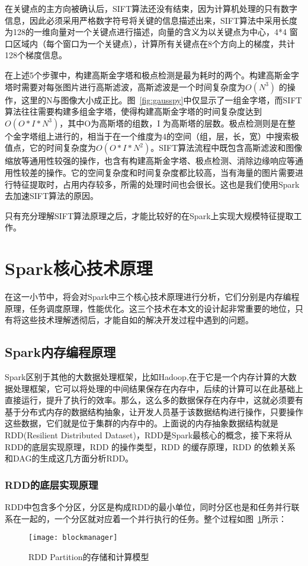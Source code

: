 在关键点的主方向被确认后，SIFT算法还没有结束，因为计算机处理的只有数字信息，因此必须采用严格数字符号将关键的信息描述出来，SIFT算法中采用长度为128的一维向量对一个关键点进行描述，向量的含义为以关键点为中心，4*4 窗口区域内（每个窗口为一个关键点），计算所有关键点在8个方向上的梯度，共计128个梯度信息。

在上述5个步骤中，构建高斯金字塔和极点检测是最为耗时的两个。构建高斯金字塔时需要对每张图片进行高斯滤波，高斯滤波是一个时间复杂度为$O(N^3)$ 的操作，这里的N与图像大小成正比。图~\ref{fig:gausspy}中仅显示了一组金字塔，而SIFT算法往往需要构建多组金字塔，使得构建高斯金字塔的时间复杂度达到$O(O*I*N^3)$，其中O为高斯塔的组数，I 为高斯塔的层数。极点检测则是在整个金字塔组上进行的，相当于在一个维度为4的空间（组，层，长，宽）中搜索极值点，它的时间复杂度为$O(O*I*N^2)$。SIFT算法流程中既包含高斯滤波和图像缩放等通用性较强的操作，也含有构建高斯金字塔、极点检测、消除边缘响应等通用性较差的操作。它的空间复杂度和时间复杂度都比较高，当有海量的图片需要进行特征提取时，占用内存较多，所需的处理时间也会很长。这也是我们使用Spark去加速SIFT算法的原因。

只有充分理解SIFT算法原理之后，才能比较好的在Spark上实现大规模特征提取工作。

\section{Spark核心技术原理}
在这一小节中，将会对Spark中三个核心技术原理进行分析，它们分别是内存编程原理，任务调度原理，性能优化。这三个技术在本文的设计起非常重要的地位，只有将这些技术理解透彻后，才能自如的解决开发过程中遇到的问题。
\subsection{Spark内存编程原理}
Spark区别于其他的大数据处理框架，比如Hadoop,在于它是一个内存计算的大数据处理框架，它可以将处理的中间结果保存在内存中，后续的计算可以在此基础上直接运行，提升了执行的效率。那么，这么多的数据保存在内存中，这就必须要有基于分布式内存的数据结构抽象，让开发人员基于该数据结构进行操作，只要操作这些数据，它们就是位于集群的内存中的。上面说的内存抽象数据结构就是RDD(Resilient Distributed Dataset)，RDD是Spark最核心的概念，接下来将从RDD的底层实现原理，RDD 的操作类型，RDD 的缓存原理，RDD 的依赖关系和DAG的生成这几方面分析RDD。
\subsubsection{RDD的底层实现原理}
RDD中包含多个分区，分区是构成RDD的最小单位，同时分区也是和任务并行联系在一起的，一个分区就对应着一个并行执行的任务。整个过程如图~\ref{fig:blockmanager}所示：
\begin{figure}[htp]
\centering
\texttt{[image: blockmanager]}
\caption{RDD Partition的存储和计算模型}
\label{fig:blockmanager}
\end{figure}

